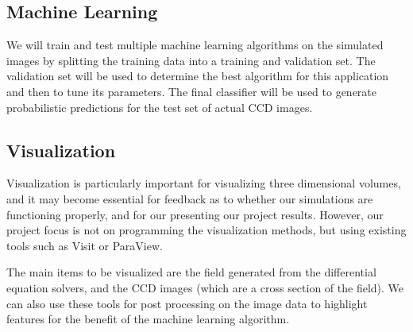 
\subsection{Machine Learning}
We will train and test multiple machine learning algorithms on the simulated images by splitting the training data into a training and validation set.  The validation set will be used to determine the best algorithm for this application and then to tune its parameters.  The final classifier will be used to generate probabilistic predictions for the test set of actual CCD images.
 

\subsection{Visualization}
Visualization is particularly important for visualizing three dimensional volumes, and it may become essential for feedback as to whether our simulations are functioning properly, and for our presenting our project results. However, our project focus is not on programming the visualization methods, but using existing tools such as Visit or ParaView.

The main items to be visualized are the field generated from the differential equation solvers, and the CCD images (which are a cross section of the field). We can also use these tools for post processing on the image data to highlight features for the benefit of the machine learning algorithm.

